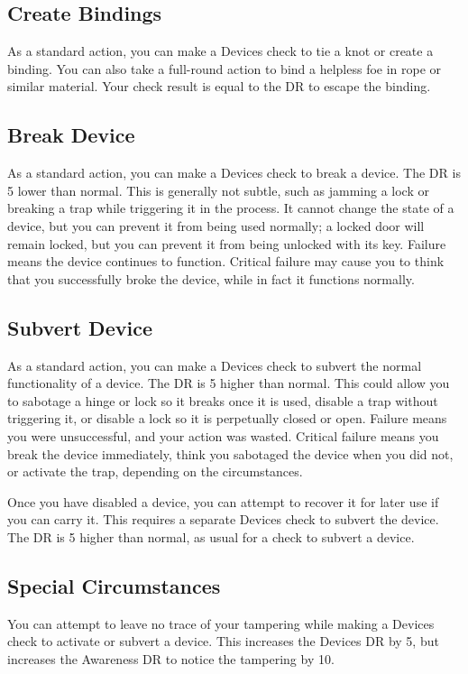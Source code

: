     \subsection{Create Bindings}
        As a standard action, you can make a Devices check to tie a knot or create a binding. You can also take a full-round action to bind a helpless foe in rope or similar material. Your check result is equal to the DR to escape the binding.

    \subsection{Break Device}
        As a standard action, you can make a Devices check to break a device. The DR is 5 lower than normal. This is generally not subtle, such as jamming a lock or breaking a trap while triggering it in the process. It cannot change the state of a device, but you can prevent it from being used normally; a locked door will remain locked, but you can prevent it from being unlocked with its key. Failure means the device continues to function. Critical failure may cause you to think that you successfully broke the device, while in fact it functions normally.

    \subsection{Subvert Device}
        As a standard action, you can make a Devices check to subvert the normal functionality of a device. The DR is 5 higher than normal. This could allow you to sabotage a hinge or lock so it breaks once it is used, disable a trap without triggering it, or disable a lock so it is perpetually closed or open. Failure means you were unsuccessful, and your action was wasted. Critical failure means you break the device immediately, think you sabotaged the device when you did not, or activate the trap, depending on the circumstances.

        Once you have disabled a device, you can attempt to recover it for later use if you can carry it. This requires a separate Devices check to subvert the device. The DR is 5 higher than normal, as usual for a check to subvert a device.

    \subsection{Special Circumstances}

        You can attempt to leave no trace of your tampering while making a Devices check to activate or subvert a device. This increases the Devices DR by 5, but increases the Awareness DR to notice the tampering by 10.

